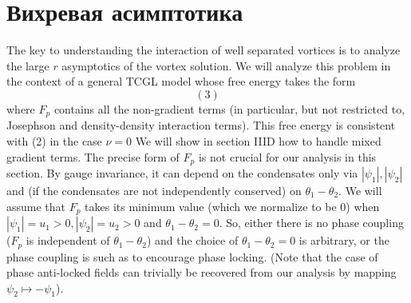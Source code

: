\chapter{Вихревая асимптотика}
\label{ch:3}

The key to understanding the interaction of well separated vortices is to 
analyze the large \( r \) asymptotics of the vortex solution. We will analyze 
this problem in the context of a general TCGL model whose free energy takes 
the form
\begin{equation}
(3)
\end{equation}
where \( F_p \) contains all the non-gradient terms (in particular, but not 
restricted to, Josephson and density-density interaction terms). This free 
energy is consistent with (2) in the case \( \nu = 0 \) We will show in 
section IIID how to handle mixed gradient terms. The precise form of \( F_p \) 
is not crucial for our analysis in this section. By gauge invariance, it can 
depend on the condensates only via \( |\psi_1|, |\psi_2| \) and (if the 
condensates are not independently conserved) on \( \theta_1 - \theta_2 \). We 
will assume that \( F_p \) takes its minimum value (which we normalize to be 
0) when \( |\psi_1| = u_1 > 0, |\psi_2| = u_2 > 0 \) and 
\( \theta_1 - \theta_2 = 0 \). So, either there is no phase coupling 
(\( F_p \) is independent of \( \theta_1 - \theta_2 \)) and the choice of 
\( \theta_1 - \theta_2 = 0 \) is arbitrary, or the phase coupling is such as 
to encourage phase locking. (Note that the case of phase anti-locked fields 
can trivially be recovered from our analysis by mapping 
\( \psi_2 \mapsto -\psi_1 \)).

